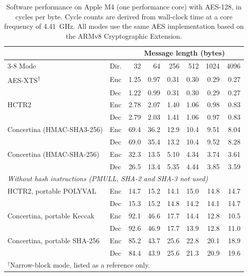\providecommand{\Scheme}{Concertina}

\begin{table}[t]
\centering
\caption{Software performance on Apple M4 (one performance core) with AES-128, in cycles per byte. Cycle counts are derived from wall-clock time at a core frequency of 4.41~GHz. All modes use the same AES implementation based on the ARMv8 Cryptographic Extension.}
\label{tab:performance}
\small
\setlength{\tabcolsep}{3.5pt}
\begin{tabular}{llrrrrrr}
\toprule
 & & \multicolumn{6}{c}{Message length (bytes)} \\
\cmidrule(l){3-8}
Mode & Dir. & 32 & 64 & 256 & 512 & 1024 & 4096 \\
\midrule
AES-XTS\textsuperscript{$\dagger$} & Enc & 1.25 & 0.97 & 0.31 & 0.30 & 0.29 & 0.27 \\
 & Dec & 1.22 & 0.99 & 0.31 & 0.30 & 0.29 & 0.27 \\
\addlinespace
HCTR2 & Enc & 2.78 & 2.07 & 1.40 & 1.06 & 0.98 & 0.83 \\
 & Dec & 2.79 & 2.03 & 1.41 & 1.06 & 0.97 & 0.83 \\
\addlinespace
\Scheme{} (HMAC-SHA3-256) & Enc & 69.4 & 36.2 & 12.9 & 10.4 & 9.51 & 8.04 \\
 & Dec & 69.0 & 35.4 & 13.2 & 10.4 & 9.52 & 8.28 \\
\addlinespace
\Scheme{} (HMAC-SHA-256) & Enc & 32.3 & 13.5 & 5.10 & 4.34 & 3.74 & 3.61 \\
 & Dec & 26.5 & 13.4 & 5.35 & 4.44 & 3.85 & 3.59 \\
\midrule
\multicolumn{8}{l}{\emph{Without hash instructions (PMULL, SHA-2 and SHA-3 not used)}} \\
HCTR2, portable POLYVAL & Enc & 14.7 & 15.2 & 14.1 & 15.0 & 14.8 & 14.7 \\
 & Dec & 15.3 & 15.2 & 14.8 & 14.2 & 14.1 & 14.7 \\
\addlinespace
\Scheme{}, portable Keccak & Enc & 92.1 & 46.6 & 17.7 & 14.4 & 12.8 & 10.5 \\
 & Dec & 92.6 & 46.9 & 17.7 & 13.9 & 12.8 & 11.0 \\
\addlinespace
\Scheme{}, portable SHA-256 & Enc & 85.2 & 43.7 & 25.6 & 22.8 & 20.1 & 18.9 \\
 & Dec & 84.4 & 43.9 & 25.6 & 21.3 & 20.9 & 19.6 \\
\bottomrule
\multicolumn{8}{l}{\footnotesize $^\dagger$Narrow-block mode, listed as a reference only.}
\end{tabular}
\end{table}

